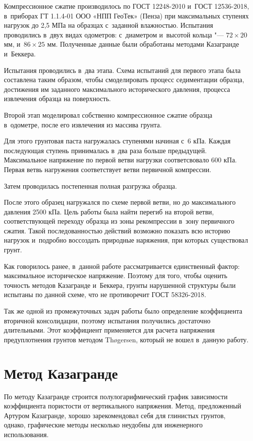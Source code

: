Компрессионное сжатие производилось по ГОСТ 12248-2010 и~ГОСТ 12536-2018, в~приборах ГТ 1.1.4-01 ООО «НПП ГеоТек» (Пенза) при максимальных ступенях нагрузок до 2,5 МПа на образцах с~заданной влажностью. Испытания проводились в~двух видах одометров: с~диаметром и~высотой кольца "--- $72 \times 20$ мм, и~$86 \times 25$ мм.
Полученные данные были обработаны методами Казагранде и~Беккера. 

Испытания проводились в~два этапа.
Схема испытаний для первого этапа была составлена таким образом, чтобы смоделировать процесс седиментации образца, достижения им заданного максимального исторического давления, процесса извлечения образца на поверхность.

Второй этап моделировал собственно компрессионное сжатие образца в~одометре, после его извлечения из массива грунта.

Для этого грунтовая паста нагружалась ступенями начиная с~6 кПа.
Каждая последующая ступень принималась в~два раза больше предыдущей.
Максимальное напряжение по первой ветви нагрузки соответсвовало 600 кПа.
Первая ветвь нагружения соответствует ветви первичной компрессии.

Затем проводилась постепенная полная разгрузка образца.

После этого образец нагружался по схеме первой ветви, но до максимального давления 2500 кПа.
Цель работы была найти перегиб на второй ветви, соответствующей переходу образца из зоны рекомпрессии в~зону первичного сжатия.
Такой последованностью действий возможно показать всю историю нагрузок и~подробно воссоздать природные наряжения, при которых существовал грунт. 

Как говорилось ранее, в~данной работе рассматривается единственный фактор: максимальное историческое напряжение.
Поэтому для того, чтобы оценить точность методов Казагранде и~Беккера, грунты нарушенной структуры были испытаны по данной схеме, что не противоречит ГОСТ 58326-2018.

Так же одной из промежуточных задач работы было определение коэффициента вторичной консолидации, поэтому испытания получились достаточно длительными. Этот коэффициент применяется для расчета напряжения предуплотнения грунтов методом Th{\o}gersen, который не вошел в~данную работу.


\section{Метод Казагранде}

По методу Казагранде строится полулогарифмический график зависимости коэффициента пористости от вертикального напряжения.  
Метод, предложенный Артуром Казагранде, хорошо зарекомендовал себя для глинистых грунтов, однако, графические методы несколько неудобны для инженерного использования.

